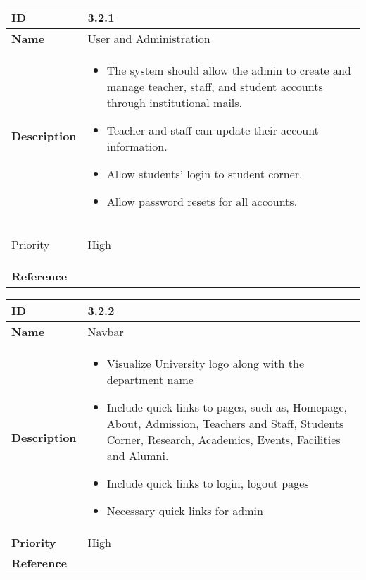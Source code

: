 \renewcommand{\arraystretch}{2}
\noindent
\begin{center}
\begin{tabular}{ | >{\bfseries}m{5em} | m{10cm} |  } 
  \hline
  ID & 3.2.1\\ 
  \hline
  Name & User and Administration \\ 
  \hline
  Description & 
  \begin{itemize}
      \item The system should allow the admin to create and manage teacher, staff, and student accounts through institutional mails.
      \item Teacher and staff can update their account information.
      \item Allow students' login to student corner.
      \item Allow password resets for all accounts.

  \end{itemize} \\
  \hline
  
  Priority & High\\
  \hline 
  Reference & \\
  \hline
\end{tabular}
\end{center}

\vspace{0.5cm}

\begin{center}
  \begin{tabular}{ | >{\bfseries}m{5em} | m{10cm} |  } 
    \hline
    ID & 3.2.2\\  
    \hline
    Name & Navbar \\  
    \hline
    Description & 
    \begin{itemize}
        \item Visualize University logo along with the department name
        \item Include quick links to pages, such as, Homepage, About, Admission, Teachers and Staff, Students Corner, Research, Academics, Events, Facilities and Alumni.
        \item Include quick links to login, logout pages
        \item Necessary quick links for admin
    \end{itemize} \\ 
    \hline
    Priority & High\\
    \hline 
    Reference & \\
    \hline
  \end{tabular}
  \end{center}

